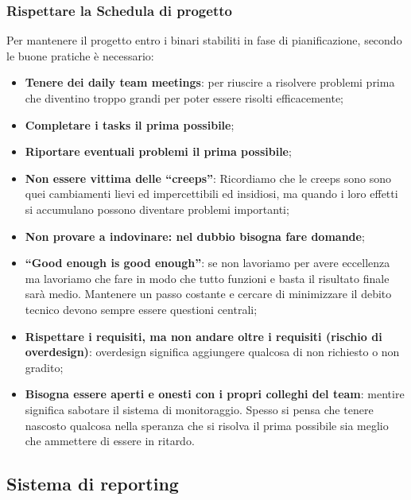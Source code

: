 \subsubsection{Rispettare la Schedula di progetto}
Per mantenere il progetto entro i binari stabiliti in fase di pianificazione, secondo le buone pratiche è necessario:
\begin{itemize}
	\item \textbf{Tenere dei daily team meetings}: per riuscire a risolvere problemi prima che diventino troppo grandi per poter essere risolti efficacemente;
	\item \textbf{Completare i tasks il prima possibile};
	\item \textbf{Riportare eventuali problemi il prima possibile};
	\item \textbf{Non essere vittima delle “creeps”}: Ricordiamo che le creeps sono sono quei cambiamenti lievi ed impercettibili ed insidiosi, ma quando i loro effetti si accumulano possono diventare problemi importanti;
	\item \textbf{Non provare a indovinare: nel dubbio bisogna fare domande};
	\item \textbf{“Good enough is good enough”}: se non lavoriamo per avere eccellenza ma lavoriamo che fare in modo che tutto funzioni e basta il risultato finale sarà medio. Mantenere un passo costante e cercare di minimizzare il debito tecnico devono sempre essere questioni centrali;
	\item \textbf{Rispettare i requisiti, ma non andare oltre i requisiti (rischio di overdesign)}: overdesign significa aggiungere qualcosa di non richiesto o non gradito;
	\item \textbf{Bisogna essere aperti e onesti con i propri colleghi del team}: mentire significa sabotare il sistema di monitoraggio. Spesso si pensa che tenere nascosto qualcosa nella speranza che si risolva il prima possibile sia meglio che ammettere di essere in ritardo.
\end{itemize}

\subsection{Sistema di reporting}
